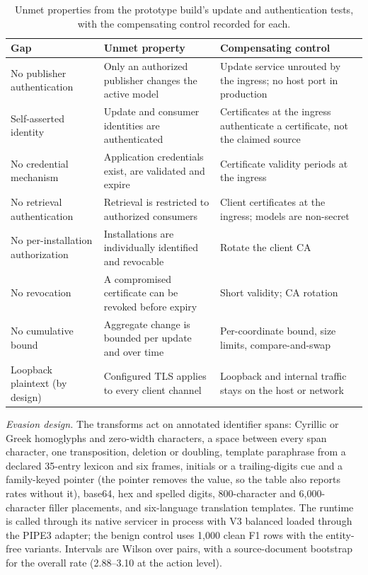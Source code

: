 \documentclass[sigconf]{acmart}
\theoremstyle{acmdefinition}\newtheorem{property}{Property}
\begin{document}
\begin{table}[!t]
\centering
\caption{Unmet properties from the prototype build's update and authentication tests, with the compensating control recorded for each.}
\label{tab:gaps}
\small
\setlength{\tabcolsep}{3pt}
\begin{tabular}{>{\raggedright\arraybackslash}p{}>{\raggedright\arraybackslash}p{}>{\raggedright\arraybackslash}p{}}
\toprule
Gap & Unmet property & Compensating control \\
\midrule
No publisher authentication & Only an authorized publisher changes the active model & Update service unrouted by the ingress; no host port in production \\
Self-asserted identity & Update and consumer identities are authenticated & Certificates at the ingress authenticate a certificate, not the claimed source \\
No credential mechanism & Application credentials exist, are validated and expire & Certificate validity periods at the ingress \\
No retrieval authentication & Retrieval is restricted to authorized consumers & Client certificates at the ingress; models are non-secret \\
No per-installation authorization & Installations are individually identified and revocable & Rotate the client CA \\
No revocation & A compromised certificate can be revoked before expiry & Short validity; CA rotation \\
No cumulative bound & Aggregate change is bounded per update and over time & Per-coordinate bound, size limits, compare-and-swap \\
Loopback plaintext (by design) & Configured TLS applies to every client channel & Loopback and internal traffic stays on the host or network \\
\bottomrule
\end{tabular}
\end{table}

\textit{Evasion design.} The transforms act on annotated identifier spans: Cyrillic or Greek homoglyphs and zero-width characters, a space between every span character, one transposition, deletion or doubling, template paraphrase from a declared 35-entry lexicon and six frames, initials or a trailing-digits cue and a family-keyed pointer (the pointer removes the value, so the table also reports rates without it), base64, hex and spelled digits, 800-character and 6,000-character filler placements, and six-language translation templates. The runtime is called through its native servicer in process with V3 balanced loaded through the PIPE3 adapter; the benign control uses 1,000 clean F1 rows with the entity-free variants. Intervals are Wilson over pairs, with a source-document bootstrap for the overall rate (2.88--3.10 at the action level).
\end{document}
